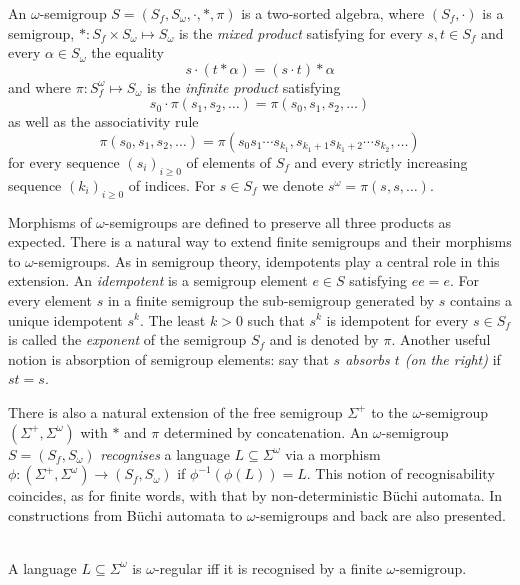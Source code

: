 \documentclass{stacs_proc}
\begin{document}
An $\omega$-semigroup $S = (S_f,S_\omega,\cdot,\ast, \pi)$ 
is a two-sorted algebra, where $(S_f,\cdot)$ is a semigroup, 
$\ast : S_f \times S_\omega \mapsto S_\omega$ is the \emph{mixed product}
satisfying for every $s,t \in S_f$ and every $\alpha \in S_\omega$ the equality
\[ 
  s \cdot (t \ast \alpha) = (s \cdot t) \ast \alpha 
\]
and where $\pi: S_f^\omega \mapsto S_\omega$ is the \emph{infinite product}
satisfying 
\[
  s_0 \cdot \pi(s_1, s_2, \ldots) = \pi(s_0, s_1, s_2, \ldots)
\]
as well as the associativity rule
\[ 
  \pi(s_0, s_1, s_2, \ldots) =  
    \pi(s_0 s_1 \cdots s_{k_1}, s_{k_1 +1} s_{k_1 +2} \cdots s_{k_2}, \ldots)
\]
for every sequence $(s_i)_{i\geq 0}$ of elements of $S_f$ and every 
strictly increasing sequence $(k_i)_{i\geq 0}$ of indices.
For $s \in S_f$ we denote $s^\omega = \pi(s, s, \ldots)$.

Morphisms of $\omega$-semigroups are defined to preserve all three products
as expected. There is a natural way to extend finite semigroups and their 
morphisms to $\omega$-semigroups. As in semigroup theory, idempotents play 
a central role in this extension.
An \emph{idempotent} is a semigroup element $e \in S$ satisfying $ee = e$. 
For every element $s$ in a finite semigroup the sub-semigroup generated by $s$ 
contains a unique idempotent $s^k$. The least $k>0$ such that $s^k$ is idempotent 
for every $s \in S_f$ is called the \emph{exponent} of the semigroup $S_f$ 
and is denoted by $\pi$. Another useful notion is absorption of semigroup elements: 
say that {\em $s$ absorbs $t$ (on the right)} if $st = s$. 



There is also a natural extension of the free semigroup $\Sigma^+$ to 
the $\omega$-semigroup $(\Sigma^+,\Sigma^\omega)$ with $\ast$ and $\pi$ 
determined by concatenation. 
An $\omega$-semigroup $S=(S_f, S_\omega)$ \emph{recognises} a language 
$L \subseteq \Sigma^\omega$ via a morphism 
$\phi : (\Sigma^+,\Sigma^\omega) \rightarrow (S_f, S_\omega)$ 
if $\phi^{-1}(\phi(L)) = L$.
This notion of recognisability coincides, as for finite words,
with that by non-deterministic B\"uchi automata. 
In \cite{PP95} constructions from B\"uchi automata to $\omega$-semigroups
and back are also presented.

\begin{theorem}[\cite{PP95}] \label{thrm_omega_semigroups} ~\\
A language $L \subseteq \Sigma^\omega$ is $\omega$-regular iff
it is recognised by a finite $\omega$-semigroup.
\end{theorem}
\end{document}
